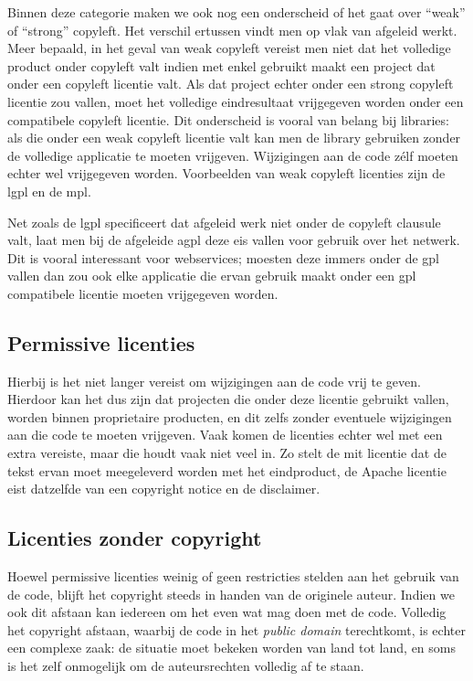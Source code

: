 Binnen deze categorie maken we ook nog een onderscheid of het gaat over ``weak'' of ``strong'' copyleft. Het verschil ertussen vindt men op vlak van afgeleid werkt. Meer bepaald, in het geval van weak copyleft vereist men niet dat het volledige product onder copyleft valt indien met enkel gebruikt maakt een project dat onder een copyleft licentie valt. Als dat project echter onder een strong copyleft licentie zou vallen, moet het volledige eindresultaat vrijgegeven worden onder een compatibele copyleft licentie.
Dit onderscheid is vooral van belang bij libraries: als die onder een weak copyleft licentie valt kan men de library gebruiken zonder de volledige applicatie te moeten vrijgeven. Wijzigingen aan de code zélf moeten echter wel vrijgegeven worden. Voorbeelden van weak copyleft licenties zijn de \ac{lgpl} en de \ac{mpl}.

Net zoals de \ac{lgpl} specificeert dat afgeleid werk niet onder de copyleft clausule valt, laat men bij de afgeleide \ac{agpl} deze eis vallen voor gebruik over het netwerk. Dit is vooral interessant voor webservices; moesten deze immers onder de \ac{gpl} vallen dan zou ook elke applicatie die ervan gebruik maakt onder een \ac{gpl} compatibele licentie moeten vrijgegeven worden.

\subsection{Permissive licenties}
\label{ontwerp:licenties:type:permissive}

Hierbij is het niet langer vereist om wijzigingen aan de code vrij te geven. Hierdoor kan het dus zijn dat projecten die onder deze licentie gebruikt vallen, worden binnen proprietaire producten, en dit zelfs zonder eventuele wijzigingen aan die code te moeten vrijgeven. Vaak komen de licenties echter wel met een extra vereiste, maar die houdt vaak niet veel in. Zo stelt de \ac{mit} licentie dat de tekst ervan moet meegeleverd worden met het eindproduct, de Apache licentie eist datzelfde van een copyright notice en de disclaimer.

\subsection{Licenties zonder copyright}
\label{ontwerp:licenties:type:public}

Hoewel permissive licenties weinig of geen restricties stelden aan het gebruik van de code, blijft het copyright steeds in handen van de originele auteur. Indien we ook dit afstaan kan iedereen om het even wat mag doen met de code. Volledig het copyright afstaan, waarbij de code in het \emph{public domain} terechtkomt, is echter een complexe zaak: de situatie moet bekeken worden van land tot land, en soms is het zelf onmogelijk om de auteursrechten volledig af te staan.

